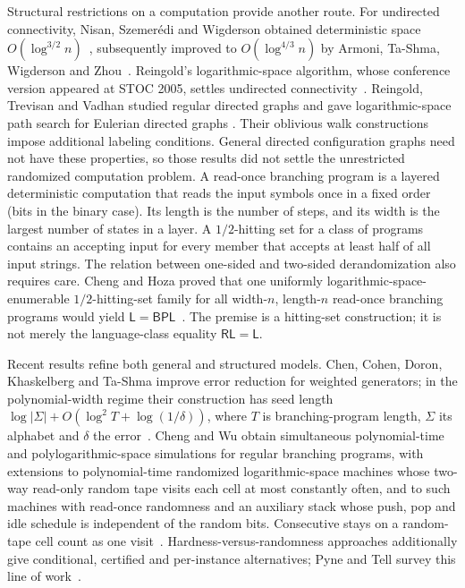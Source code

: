 Structural restrictions on a computation provide another route.
For undirected connectivity, Nisan, Szemer\'edi and Wigderson obtained
deterministic space $O(\log^{3/2}n)$~\cite{NisanSzemerediWigderson1992},
subsequently improved to $O(\log^{4/3}n)$ by Armoni, Ta-Shma,
Wigderson and Zhou~\cite{ArmoniTaShmaWigdersonZhou2000}.
Reingold's logarithmic-space algorithm, whose conference version
appeared at STOC 2005, settles undirected connectivity~\cite{Reingold2005,Reingold2008}.
Reingold, Trevisan and Vadhan studied regular directed graphs and gave
logarithmic-space path search for Eulerian directed graphs
\cite{RTV2006}. Their oblivious walk constructions impose additional
labeling conditions. General directed configuration graphs need not
have these properties, so those results did not settle the unrestricted
randomized computation problem.
A read-once branching program is a layered deterministic computation
that reads the input symbols once in a fixed order (bits in the binary
case). Its length is the number of steps,
and its width is the largest number of states in a layer.
A $1/2$-hitting set for a class of programs contains an accepting input
for every member that accepts at least half of all input strings.
The relation between one-sided and two-sided derandomization also
requires care. Cheng and Hoza proved that one uniformly logarithmic-space-enumerable
$1/2$-hitting-set family for all width-$n$, length-$n$ read-once branching
programs would yield
$\mathsf L=\mathsf{BPL}$~\cite{ChengHoza2022}.
The premise is a hitting-set construction; it is not merely the
language-class equality $\mathsf{RL}=\mathsf L$.

Recent results refine both general and structured models.
Chen, Cohen, Doron, Khaskelberg and Ta-Shma improve error reduction for
weighted generators; in the polynomial-width regime their construction
has seed length $\log|\Sigma|+O(\log^2 T+\log(1/\delta))$, where
$T$ is branching-program length, $\Sigma$ its alphabet and $\delta$
the error~\cite{ChenCohenDoronKhaskelbergTaShma2026}.
Cheng and Wu obtain simultaneous polynomial-time and polylogarithmic-space
simulations for regular branching programs, with extensions to polynomial-time
randomized logarithmic-space machines whose two-way read-only random tape
visits each cell at most constantly often, and to such machines with read-once randomness
and an auxiliary stack whose push, pop and idle schedule is independent
of the random bits. Consecutive stays on a random-tape cell count as one
visit~\cite[Theorems~5--6]{ChengWu2026SC}.
Hardness-versus-randomness approaches additionally give conditional,
certified and per-instance alternatives; Pyne and Tell survey this
line of work~\cite{PyneTell2026}.

